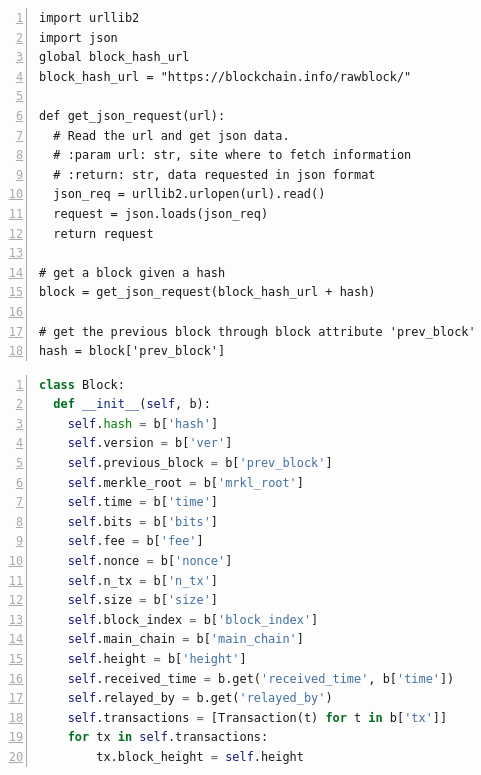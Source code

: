 \documentclass[USenglish]{uit-thesis}
\begin{document}
\begin{appendices}
\begin{lstlisting}[numbers=left,frame=single,caption={Data retrieval using \gls{rest}ful \gls{api}s provided from \url{blockchain.info}.}]
import urllib2
import json
global block_hash_url
block_hash_url = "https://blockchain.info/rawblock/"

def get_json_request(url):
  # Read the url and get json data.
  # :param url: str, site where to fetch information
  # :return: str, data requested in json format
  json_req = urllib2.urlopen(url).read()
  request = json.loads(json_req)
  return request

# get a block given a hash
block = get_json_request(block_hash_url + hash)

# get the previous block through block attribute 'prev_block'
hash = block['prev_block']
\end{lstlisting}


\begin{lstlisting}[float, numbers=left,frame=single,caption={Block object structure obtained using Bitcoin's \gls{api}s},language=Python]
class Block:
  def __init__(self, b):
    self.hash = b['hash']
    self.version = b['ver']
    self.previous_block = b['prev_block']
    self.merkle_root = b['mrkl_root']
    self.time = b['time']
    self.bits = b['bits']
    self.fee = b['fee']
    self.nonce = b['nonce']
    self.n_tx = b['n_tx']
    self.size = b['size']
    self.block_index = b['block_index']
    self.main_chain = b['main_chain']
    self.height = b['height']
    self.received_time = b.get('received_time', b['time'])
    self.relayed_by = b.get('relayed_by')
    self.transactions = [Transaction(t) for t in b['tx']]
    for tx in self.transactions:
        tx.block_height = self.height
\end{lstlisting}




\end{appendices}
\end{document}
